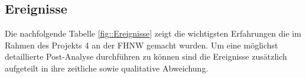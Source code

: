\subsection{Ereignisse}
Die nachfolgende Tabelle \ref{fig::Ereignisse} zeigt die wichtigsten Erfahrungen die im Rahmen des Projekts 4 an der FHNW gemacht wurden. Um eine möglichst detaillierte Post-Analyse durchführen zu können sind die Ereignisse zusätzlich aufgeteilt in ihre zeitliche sowie qualitative Abweichung. 

\begin{table}[h]
\centering
{}
\end{table}
